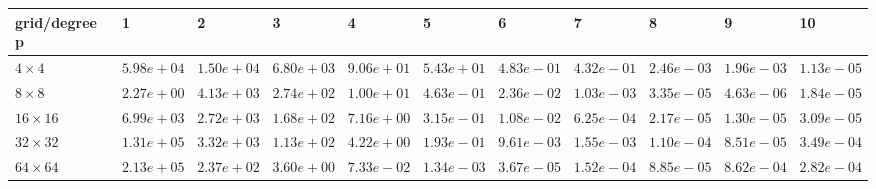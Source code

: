 \begin{tabular}{lllllllllll}
\hline
 grid/degree p   & 1          & 2          & 3          & 4          & 5          & 6          & 7          & 8          & 9          & 10         \\
\hline
 $4 \times 4$    & $5.98e+04$ & $1.50e+04$ & $6.80e+03$ & $9.06e+01$ & $5.43e+01$ & $4.83e-01$ & $4.32e-01$ & $2.46e-03$ & $1.96e-03$ & $1.13e-05$ \\
 $8 \times 8$    & $2.27e+00$ & $4.13e+03$ & $2.74e+02$ & $1.00e+01$ & $4.63e-01$ & $2.36e-02$ & $1.03e-03$ & $3.35e-05$ & $4.63e-06$ & $1.84e-05$ \\
 $16 \times 16$  & $6.99e+03$ & $2.72e+03$ & $1.68e+02$ & $7.16e+00$ & $3.15e-01$ & $1.08e-02$ & $6.25e-04$ & $2.17e-05$ & $1.30e-05$ & $3.09e-05$ \\
 $32 \times 32$  & $1.31e+05$ & $3.32e+03$ & $1.13e+02$ & $4.22e+00$ & $1.93e-01$ & $9.61e-03$ & $1.55e-03$ & $1.10e-04$ & $8.51e-05$ & $3.49e-04$ \\
 $64 \times 64$  & $2.13e+05$ & $2.37e+02$ & $3.60e+00$ & $7.33e-02$ & $1.34e-03$ & $3.67e-05$ & $1.52e-04$ & $8.85e-05$ & $8.62e-04$ & $2.82e-04$ \\
\hline
\end{tabular}